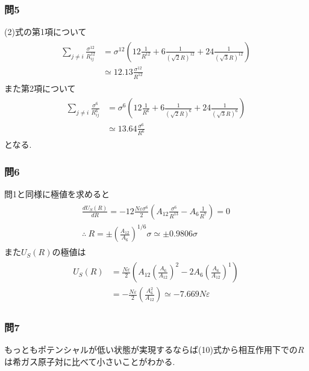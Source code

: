 \documentclass[uplatex,a4j,11pt,dvipdfmx]{jsarticle}
\begin{document}
\subsubsection*{問5}
(2)式の第1項について
\begin{align}
  \begin{split}
    \sum_{j\neq i}\frac{\sigma^{12}}{R_{ij}^{12}}&=\sigma^{12}\left(12\frac{1}{R^{12}}+6\frac{1}{(\sqrt{2}R)^{12}}+24\frac{1}{(\sqrt{3}R)^{12}}\right)\\
    &\simeq12.13\frac{\sigma^{12}}{R^{12}}
  \end{split}
\end{align}
また第2項について
\begin{align}
  \begin{split}
    \sum_{j\neq i}\frac{\sigma^{6}}{R_{ij}^{6}}&=\sigma^{6}\left(12\frac{1}{R^{6}}+6\frac{1}{(\sqrt{2}R)^{6}}+24\frac{1}{(\sqrt{3}R)^{6}}\right)\\
    &\simeq13.64\frac{\sigma^{6}}{R^{6}}
  \end{split}
\end{align}
となる.
\subsubsection*{問6}
問1と同様に極値を求めると
\begin{align}
  \begin{split}
    \frac{dU_S(R)}{dR}=-12\frac{N\varepsilon\sigma^6}{2}\left(A_{12}\frac{\sigma^6}{R^{13}}-A_6\frac{1}{R^7}\right)=0\\
    \therefore\ R=\pm\left(\frac{A_{12}}{A_6}\right)^{1/6}\sigma\simeq\pm0.9806\sigma
  \end{split}
\end{align}
また$U_S(R)$の極値は
\begin{align}
  \begin{split}
    U_S(R)&=\frac{N\varepsilon}{2}\left(A_{12}\left(\frac{A_6}{A_{12}}\right)^2-2A_6\left(\frac{A_6}{A_{12}}\right)^1\right)\\
    &=-\frac{N\varepsilon}{2}\left(\frac{A_6^2}{A_{12}}\right)\simeq-7.669N\varepsilon
  \end{split}
\end{align}
\subsubsection*{問7}
もっともポテンシャルが低い状態が実現するならば(10)式から相互作用下での$R$は希ガス原子対に比べて小さいことがわかる.
\end{document}

